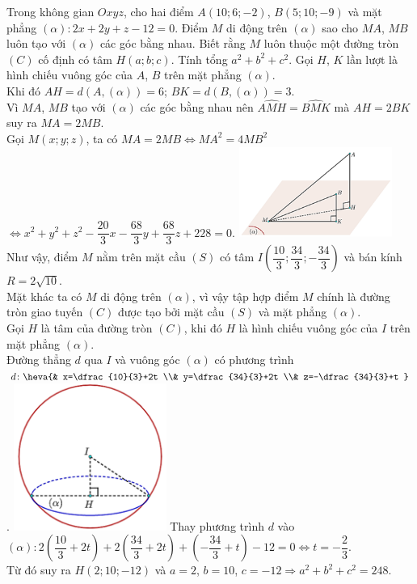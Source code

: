 \begin{ex}%
Trong không gian $ Oxyz$, cho hai điểm $ A(10;6;-2)$, $B(5;10;-9)$ và mặt phẳng $(\alpha)\colon 2x+2y+z-12=0$. Điểm $ M$ di động trên $\left(\alpha\right)$ sao cho $ MA$, $ MB$ luôn tạo với $(\alpha)$ các góc bằng nhau. Biết rằng $ M$ luôn thuộc một đường tròn $(C)$ cố định có tâm $ H(a;b;c)$. Tính tổng $a^2+b^2+c^2$.
\loigiai
{
\immini
{
    Gọi $H$, $K$ lần lượt là hình chiếu vuông góc của $A$, $B$ trên mặt phẳng $\left(\alpha \right)$.\\
Khi đó $AH=d\left(A,\left(\alpha \right)\right)=6$; $BK=d\left(B,(\alpha )\right)=3$.\\
Vì $MA$, $MB$ tạo với $\left(\alpha \right)$ các góc bằng nhau nên $\widehat{AMH}=\widehat{BMK}$ mà $AH=2BK$ suy ra $MA=2MB$.\\
Gọi $M(x;y;z)$, ta có $MA=2MB\Leftrightarrow MA^2=4MB^2$\\
$ \Leftrightarrow x^2+y^2+z^2-\dfrac{20}{3}x-\dfrac{68}{3}y+\dfrac{68}{3}z+228=0$.
}
{
    \includegraphics[width=5cm]{img/HXN-9-22-LG-a}
}
\immini
{
    Như vậy, điểm $M$ nằm trên mặt cầu $(S)$ có tâm $I\left(\dfrac{10}{3};\dfrac{34}{3};-\dfrac{34}{3}\right)$ và bán kính $R=2\sqrt{10}$.\\
Mặt khác ta có $M$ di động trên $\left(\alpha \right)$, vì vậy tập hợp điểm $M$ chính là đường tròn giao tuyến $(C)$ được tạo bởi mặt cầu $(S)$ và mặt phẳng $\left(\alpha \right)$.\\
Gọi $H$ là tâm của đường tròn $(C)$, khi đó $H$ là hình chiếu vuông góc của $I$ trên mặt phẳng $\left(\alpha \right)$.\\
Đường thẳng $d$ qua $I$ và vuông góc  $\left(\alpha \right)$ có phương trình  $d\colon \heva{& x=\dfrac{10}{3}+2t \\& y=\dfrac{34}{3}+2t \\& z=-\dfrac{34}{3}+t }$.
}
{
    \includegraphics[width=5cm]{img/HXN-9-22-LG-b}
}
Thay phương trình  $d$ vào $\left(\alpha \right)\colon 2\left(\dfrac{10}{3}+2t\right)+2\left(\dfrac{34}{3}+2t\right)+\left(-\dfrac{34}{3}+t\right)-12=0\Leftrightarrow t=-\dfrac{2}{3}$.\\
Từ đó suy ra $H(2;10;-12)$ và $a=2$, $b=10$, $c=-12\Rightarrow a^2+b^2+c^2=248$.
}
\end{ex}

